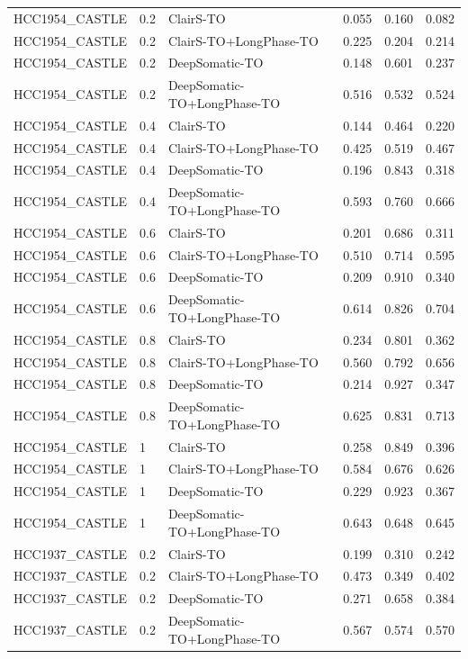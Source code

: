 \documentclass[pdflatex,sn-nature]{sn-jnl}
\begin{document}
{\begin{longtable}{@{}lllccc@{}}
  \addlinespace
  HCC1954\_CASTLE & 0.2 & ClairS-TO & 0.055 & 0.160 & 0.082 \\
  HCC1954\_CASTLE & 0.2 & ClairS-TO+LongPhase-TO & 0.225 & 0.204 & 0.214 \\
  HCC1954\_CASTLE & 0.2 & DeepSomatic-TO & 0.148 & 0.601 & 0.237 \\
  HCC1954\_CASTLE & 0.2 & DeepSomatic-TO+LongPhase-TO & 0.516 & 0.532 & 0.524 \\
  HCC1954\_CASTLE & 0.4 & ClairS-TO & 0.144 & 0.464 & 0.220 \\
  HCC1954\_CASTLE & 0.4 & ClairS-TO+LongPhase-TO & 0.425 & 0.519 & 0.467 \\
  HCC1954\_CASTLE & 0.4 & DeepSomatic-TO & 0.196 & 0.843 & 0.318 \\
  HCC1954\_CASTLE & 0.4 & DeepSomatic-TO+LongPhase-TO & 0.593 & 0.760 & 0.666 \\
  HCC1954\_CASTLE & 0.6 & ClairS-TO & 0.201 & 0.686 & 0.311 \\
  HCC1954\_CASTLE & 0.6 & ClairS-TO+LongPhase-TO & 0.510 & 0.714 & 0.595 \\
  HCC1954\_CASTLE & 0.6 & DeepSomatic-TO & 0.209 & 0.910 & 0.340 \\
  HCC1954\_CASTLE & 0.6 & DeepSomatic-TO+LongPhase-TO & 0.614 & 0.826 & 0.704 \\
  HCC1954\_CASTLE & 0.8 & ClairS-TO & 0.234 & 0.801 & 0.362 \\
  HCC1954\_CASTLE & 0.8 & ClairS-TO+LongPhase-TO & 0.560 & 0.792 & 0.656 \\
  HCC1954\_CASTLE & 0.8 & DeepSomatic-TO & 0.214 & 0.927 & 0.347 \\
  HCC1954\_CASTLE & 0.8 & DeepSomatic-TO+LongPhase-TO & 0.625 & 0.831 & 0.713 \\
  HCC1954\_CASTLE & 1 & ClairS-TO & 0.258 & 0.849 & 0.396 \\
  HCC1954\_CASTLE & 1 & ClairS-TO+LongPhase-TO & 0.584 & 0.676 & 0.626 \\
  HCC1954\_CASTLE & 1 & DeepSomatic-TO & 0.229 & 0.923 & 0.367 \\
  HCC1954\_CASTLE & 1 & DeepSomatic-TO+LongPhase-TO & 0.643 & 0.648 & 0.645 \\
  \addlinespace
  HCC1937\_CASTLE & 0.2 & ClairS-TO & 0.199 & 0.310 & 0.242 \\
  HCC1937\_CASTLE & 0.2 & ClairS-TO+LongPhase-TO & 0.473 & 0.349 & 0.402 \\
  HCC1937\_CASTLE & 0.2 & DeepSomatic-TO & 0.271 & 0.658 & 0.384 \\
  HCC1937\_CASTLE & 0.2 & DeepSomatic-TO+LongPhase-TO & 0.567 & 0.574 & 0.570 \\

\end{longtable}}
\end{document}
